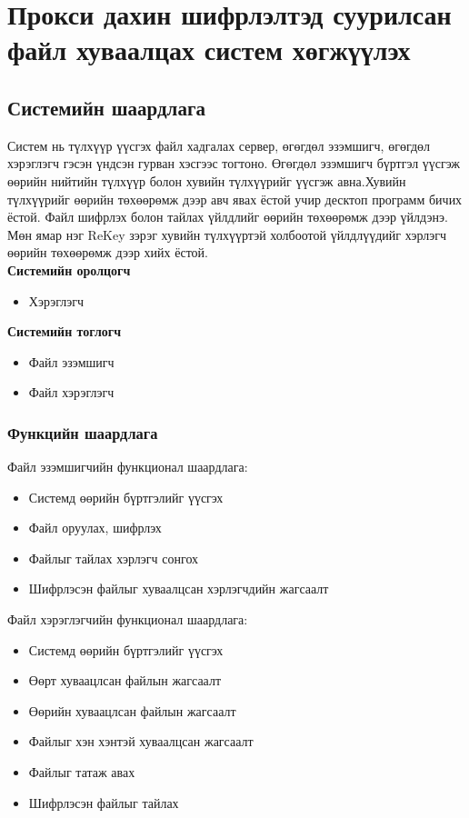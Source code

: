 
\chapter{Прокси дахин шифрлэлтэд суурилсан файл хуваалцах систем хөгжүүлэх}

\label{Chapter3} %
\pagecolor{white}

\section{Системийн шаардлага}
Систем нь түлхүүр үүсгэх файл хадгалах сервер, өгөгдөл эзэмшигч, өгөгдөл хэрэглэгч гэсэн үндсэн гурван хэсгээс тогтоно. Өгөгдөл эзэмшигч бүртгэл үүсгэж өөрийн нийтийн түлхүүр болон хувийн түлхүүрийг үүсгэж авна.Хувийн түлхүүрийг өөрийн төхөөрөмж дээр авч явах ёстой учир десктоп программ бичих ёстой. Файл шифрлэх болон тайлах үйлдлийг өөрийн төхөөрөмж дээр үйлдэнэ. Мөн ямар нэг ReKey зэрэг хувийн түлхүүртэй холбоотой үйлдлүүдийг хэрлэгч өөрийн төхөөрөмж дээр хийх ёстой.\\

\textbf{Системийн оролцогч}
\begin{itemize}
    \item Хэрэглэгч
\end{itemize}

\textbf{Системийн тоглогч}
\begin{itemize}
    \item Файл эзэмшигч
    \item Файл хэрэглэгч
\end{itemize}

\subsection*{Функцийн шаардлага}
Файл эзэмшигчийн функционал шаардлага:
\begin{itemize}
    \item Системд өөрийн бүртгэлийг үүсгэх
    \item Файл оруулах, шифрлэх
    \item Файлыг тайлах хэрлэгч сонгох
    \item Шифрлэсэн файлыг хуваалцсан хэрлэгчдийн жагсаалт
\end{itemize}
Файл хэрэглэгчийн функционал шаардлага:
\begin{itemize}
    \item Системд өөрийн бүртгэлийг үүсгэх
    \item Өөрт хуваацлсан файлын жагсаалт
    \item Өөрийн хуваацлсан файлын жагсаалт
    \item Файлыг хэн хэнтэй хуваалцсан жагсаалт
    \item Файлыг татаж авах
    \item Шифрлэсэн файлыг тайлах
\end{itemize}

